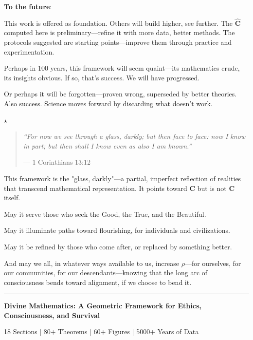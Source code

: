 \documentclass[11pt,a4paper]{article}
\theoremstyle{definition}
\theoremstyle{remark}
\begin{document}
\begin{enumerate}
\begin{protocol}
\textbf{To the future}:

This work is offered as foundation. Others will build higher, see further. The \(\hat{\mathbf{C}}\) computed here is preliminary—refine it with more data, better methods. The protocols suggested are starting points—improve them through practice and experimentation.

Perhaps in 100 years, this framework will seem quaint—its mathematics crude, its insights obvious. If so, that's success. We will have progressed.

Or perhaps it will be forgotten—proven wrong, superseded by better theories. Also success. Science moves forward by discarding what doesn't work.

\begin{center}
\(\star\)
\end{center}

\begin{quote}
\textit{``For now we see through a glass, darkly; but then face to face: now I know in part; but then shall I know even as also I am known.''}

— 1 Corinthians 13:12
\end{quote}

This framework is the "glass, darkly"—a partial, imperfect reflection of realities that transcend mathematical representation. It points toward \(\mathbf{C}\) but is not \(\mathbf{C}\) itself.

May it serve those who seek the Good, the True, and the Beautiful.

May it illuminate paths toward flourishing, for individuals and civilizations.

May it be refined by those who come after, or replaced by something better.

And may we all, in whatever ways available to us, increase \(\rho\)—for ourselves, for our communities, for our descendants—knowing that the long arc of consciousness bends toward alignment, if we choose to bend it.


\begin{center}
\rule{0.6\linewidth}{0.5pt}

\vspace{1em}

\textbf{Divine Mathematics: A Geometric Framework for Ethics, Consciousness, and Survival}

\vspace{0.5em}

18 Sections | 80+ Theorems | 60+ Figures | 5000+ Years of Data


\end{center}
\end{protocol}
\end{enumerate}
\end{document}
